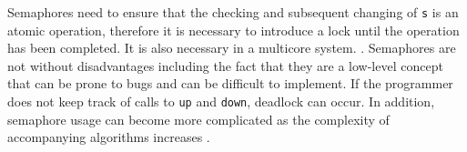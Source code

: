 \documentclass[12pt,a4paper,oneside]{article}
\def\code#1{\texttt{#1}}
\begin{document}
\begin{spacing}{1.4}
Semaphores need to ensure that the checking and subsequent changing of \code{s} is an atomic operation, therefore it is necessary to introduce a lock until the operation has been completed. It is also necessary in a multicore system. \citep{modernOS}. Semaphores are not without disadvantages including the fact that they are a low-level concept that can be prone to bugs and can be difficult to implement. If the programmer does not keep track of calls to \code{up} and \code{down}, deadlock can occur. In addition, semaphore usage can become more complicated as the complexity of accompanying algorithms increases \citep{semDisadvantages}.

\end{spacing}	   			

\end{document}
